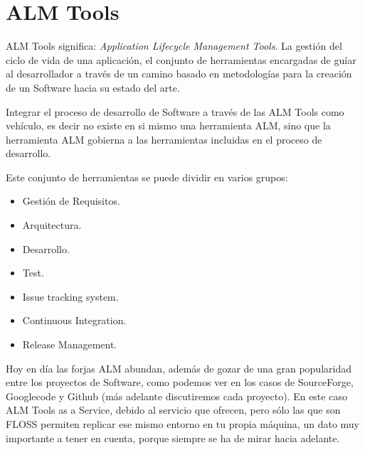 \section{ALM Tools}
\label{sec:almtools}

\par ALM Tools significa: \emph{Application Lifecycle Management Tools}. La gesti\'on del ciclo de vida de una aplicaci\'on, el conjunto de herramientas encargadas de gu\'iar al desarrollador a trav\'es de un camino basado en metodolog\'ias para la creaci\'on de un Software hacia su estado del arte.

\par Integrar el proceso de desarrollo de Software a trav\'es de las ALM Tools como veh\'iculo, es decir no existe en si mismo una herramienta ALM, sino que la herramienta ALM gobierna a las herramientas incluidas en el proceso de desarrollo.

\par Este conjunto de herramientas se puede dividir en varios grupos:

\begin{itemize}
	\item Gesti\'on de Requisitos.
	\item Arquitectura.
	\item Desarrollo.
	\item Test.
	\item Issue tracking system.
	\item Continuous Integration.
	\item Release Management.
\end{itemize}

\par Hoy en d\'ia las forjas ALM abundan, adem\'as de gozar de una gran popularidad entre los proyectos de Software, como podemos ver en los casos de SourceForge, Googlecode y Github (más adelante discutiremos cada proyecto). En este caso ALM Tools as a Service, debido al servicio que ofrecen, pero sólo las que son FLOSS permiten replicar ese mismo entorno en tu propia máquina, un dato muy importante a tener en cuenta, porque siempre se ha de mirar hacia adelante.